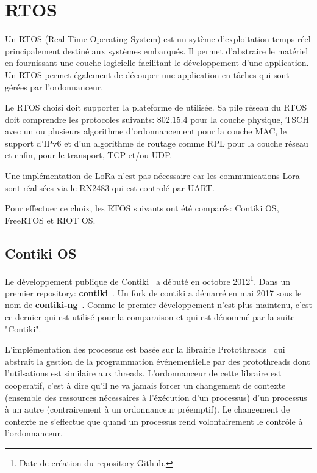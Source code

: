 \section{RTOS}

Un RTOS (Real Time Operating System) est un sytème d'exploitation temps réel principalement destiné aux systèmes embarqués. Il permet d'abstraire le matériel en fournissant une couche logicielle facilitant le développement d'une application. Un RTOS permet également de découper une application en tâches qui sont gérées par l'ordonnanceur.

%

Le RTOS choisi doit supporter la plateforme de utilisée. Sa pile réseau du RTOS doit comprendre les protocoles suivants: 802.15.4 pour la couche physique, TSCH avec un ou plusieurs algorithme d'ordonnancement pour la couche MAC, le support d'IPv6 et d'un algorithme de routage comme RPL pour la couche réseau et enfin, pour le transport, TCP et/ou UDP.

Une implémentation de LoRa n'est pas nécessaire car les communications Lora sont réalisées via le 
RN2483 qui est controlé par UART.

Pour effectuer ce choix, les RTOS suivants ont été comparés: Contiki OS, FreeRTOS et RIOT OS.

\subsection*{Contiki OS}
    Le développement publique de Contiki~\cite{paper:contiki} a débuté en octobre 2012\footnote{Date de création du repository Github.}. Dans un premier repository: \textbf{contiki}~\cite{contiki-repo:old}. Un fork de contiki a démarré en mai 2017 sous le nom de \textbf{contiki-ng}~\cite{contiki-repo:ng}. Comme le premier développement n'est plus maintenu, c'est ce dernier qui est utilisé pour la comparaison et qui est dénommé par la suite "Contiki".

    L'implémentation des processus est basée sur la librairie Protothreads~\cite{paper:protothreads}
    qui abstrait la gestion de la programmation événementielle par des protothreads dont l'utilsations est similaire aux threads. L'ordonnanceur de cette libraire est cooperatif, c'est à dire qu'il ne va jamais forcer un changement de contexte (ensemble des ressources nécessaires à l'éxécution d'un processus) d'un processus à un autre (contrairement à un ordonnanceur préemptif). Le changement de contexte ne s'effectue que quand un processus rend volontairement le contrôle à l'ordonnanceur.

